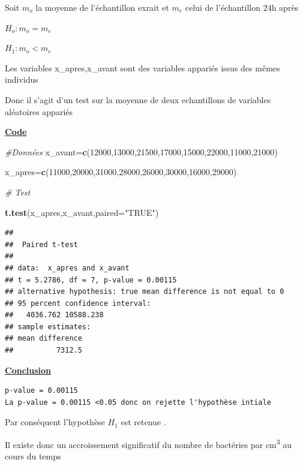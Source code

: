 \documentclass[
]{article}
\newenvironment{Shaded}{\begin{snugshade}}{\end{snugshade}}
\newcommand{\AttributeTok}[1]{\textcolor[rgb]{0.13,0.29,0.53}{#1}}
\newcommand{\CommentTok}[1]{\textcolor[rgb]{0.56,0.35,0.01}{\textit{#1}}}
\newcommand{\DecValTok}[1]{\textcolor[rgb]{0.00,0.00,0.81}{#1}}
\newcommand{\FunctionTok}[1]{\textcolor[rgb]{0.13,0.29,0.53}{\textbf{#1}}}
\newcommand{\NormalTok}[1]{#1}
\newcommand{\OtherTok}[1]{\textcolor[rgb]{0.56,0.35,0.01}{#1}}
\newcommand{\StringTok}[1]{\textcolor[rgb]{0.31,0.60,0.02}{#1}}
\begin{document}
Soit \(m_o\) la moyenne de l'échantillon exrait et \(m_e\) celui de
l'échantillon 24h après

\(H_o:m_o= m_e\)

\(H_1:m_o < m_e\)

Les variables x\_apres,x\_avant sont des variables appariés issus des
mêmes individus

Donc il s'agit d'un test sur la moyenne de deux echantillons de
variables aléatoires appariés

\ul{\textbf{Code}}

\begin{Shaded}
\begin{Highlighting}[]
\CommentTok{\#Données}
\NormalTok{x\_avant}\OtherTok{=}\FunctionTok{c}\NormalTok{(}\DecValTok{12000}\NormalTok{,}\DecValTok{13000}\NormalTok{,}\DecValTok{21500}\NormalTok{,}\DecValTok{17000}\NormalTok{,}\DecValTok{15000}\NormalTok{,}\DecValTok{22000}\NormalTok{,}\DecValTok{11000}\NormalTok{,}\DecValTok{21000}\NormalTok{)}

\NormalTok{x\_apres}\OtherTok{=}\FunctionTok{c}\NormalTok{(}\DecValTok{11000}\NormalTok{,}\DecValTok{20000}\NormalTok{,}\DecValTok{31000}\NormalTok{,}\DecValTok{28000}\NormalTok{,}\DecValTok{26000}\NormalTok{,}\DecValTok{30000}\NormalTok{,}\DecValTok{16000}\NormalTok{,}\DecValTok{29000}\NormalTok{)}


\CommentTok{\# Test }

\FunctionTok{t.test}\NormalTok{(x\_apres,x\_avant,}\AttributeTok{paired=}\StringTok{"TRUE"}\NormalTok{)}
\end{Highlighting}
\end{Shaded}

\begin{verbatim}
## 
##  Paired t-test
## 
## data:  x_apres and x_avant
## t = 5.2786, df = 7, p-value = 0.00115
## alternative hypothesis: true mean difference is not equal to 0
## 95 percent confidence interval:
##   4036.762 10588.238
## sample estimates:
## mean difference 
##          7312.5
\end{verbatim}

\ul{\textbf{Conclusion}}

\begin{verbatim}
p-value = 0.00115 
La p-value = 0.00115 <0.05 donc on rejette l'hypothèse intiale 
\end{verbatim}

Par conséquent l'hypothèse \(H_1\) est retenue .

Il existe donc un accroissement significatif du nombre de bactéries par
cm\textsuperscript{3} au cours du temps
\end{document}
